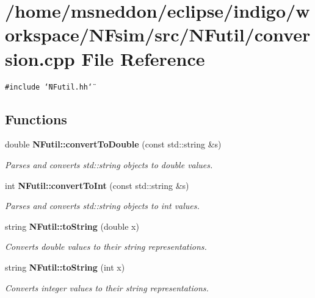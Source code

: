 \section{/home/msneddon/eclipse/indigo/workspace/NFsim/src/NFutil/conversion.cpp File Reference}
\label{conversion_8cpp}


{\tt \#include \char`\"{}NFutil.hh\char`\"{}}\par
\subsection*{Functions}
\begin{CompactItemize}
\item 
double {\bf NFutil::convertToDouble} (const std::string \&s)
\begin{CompactList}\small\item\em Parses and converts std::string objects to double values. \item\end{CompactList}\item 
int {\bf NFutil::convertToInt} (const std::string \&s)
\begin{CompactList}\small\item\em Parses and converts std::string objects to int values. \item\end{CompactList}\item 
string {\bf NFutil::toString} (double x)
\begin{CompactList}\small\item\em Converts double values to their string representations. \item\end{CompactList}\item 
string {\bf NFutil::toString} (int x)
\begin{CompactList}\small\item\em Converts integer values to their string representations. \item\end{CompactList}\end{CompactItemize}
